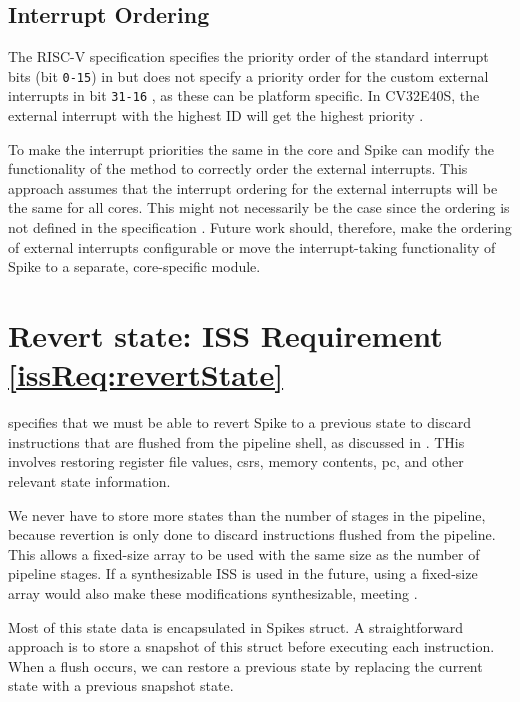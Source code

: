 \subsection{Interrupt Ordering}

The RISC-V specification specifies the priority order of the standard interrupt bits (bit \texttt{0-15}) in  but does not specify a priority order for the custom external interrupts in bit \texttt{31-16} \cite{watermanRISCVInstructionSet2021}, as these can be platform specific. In CV32E40S, the external interrupt with the highest ID will get the highest priority \cite{openhwgroupExceptionsInterruptsCOREV2023}.

To make the interrupt priorities the same in the core and Spike can modify the functionality of the  method to correctly order the external interrupts. This approach assumes that the interrupt ordering for the external interrupts will be the same for all cores. This might not necessarily be the case since the ordering is not defined in the specification \cite{watermanRISCVInstructionSet2021}. Future work should, therefore, make the ordering of external interrupts configurable or move the interrupt-taking functionality of Spike to a separate, core-specific module.

\section{Revert state: ISS Requirement \ref{issReq:revertState}}
\label{sec:iss_revert}

 specifies that we must be able to revert Spike to a previous state to discard instructions that are flushed from the pipeline shell, as discussed in . THis involves restoring register file values, \acrshort{csr}s, memory contents, \acrshort{pc}, and other relevant state information. 

We never have to store more states than the number of stages in the pipeline, because revertion is only done to discard instructions flushed from the pipeline. This allows a fixed-size array to be used with the same size as the number of pipeline stages. If a synthesizable ISS is used in the future, using a fixed-size array would also make these modifications synthesizable, meeting .

Most of this state data is encapsulated in Spikes  struct. A straightforward approach is to store a snapshot of this struct before executing each instruction. When a flush occurs, we can restore a previous state by replacing the current state with a previous snapshot state. 

